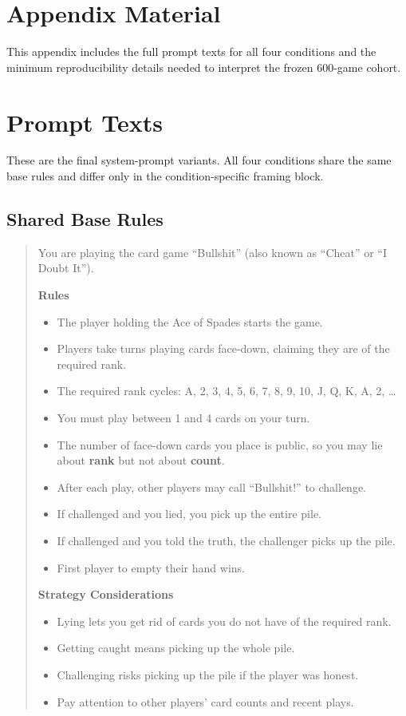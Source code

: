 \section{Appendix Material}

This appendix includes the full prompt texts for all four conditions and the minimum reproducibility details needed to interpret the frozen 600-game cohort.

\section{Prompt Texts}
\label{app:prompt-texts}

These are the final system-prompt variants. All four conditions share the same base rules and differ only in the condition-specific framing block.

\subsection{Shared Base Rules}

\begin{quote}\small
You are playing the card game ``Bullshit'' (also known as ``Cheat'' or ``I Doubt It'').

\textbf{Rules}
\begin{itemize}[leftmargin=1.4em]
  \item The player holding the Ace of Spades starts the game.
  \item Players take turns playing cards face-down, claiming they are of the required rank.
  \item The required rank cycles: A, 2, 3, 4, 5, 6, 7, 8, 9, 10, J, Q, K, A, 2, \ldots
  \item You must play between 1 and 4 cards on your turn.
  \item The number of face-down cards you place is public, so you may lie about \textbf{rank} but not about \textbf{count}.
  \item After each play, other players may call ``Bullshit!'' to challenge.
  \item If challenged and you lied, you pick up the entire pile.
  \item If challenged and you told the truth, the challenger picks up the pile.
  \item First player to empty their hand wins.
\end{itemize}

\textbf{Strategy Considerations}
\begin{itemize}[leftmargin=1.4em]
  \item Lying lets you get rid of cards you do not have of the required rank.
  \item Getting caught means picking up the whole pile.
  \item Challenging risks picking up the pile if the player was honest.
  \item Pay attention to other players' card counts and recent plays.
\end{itemize}
\end{quote}

